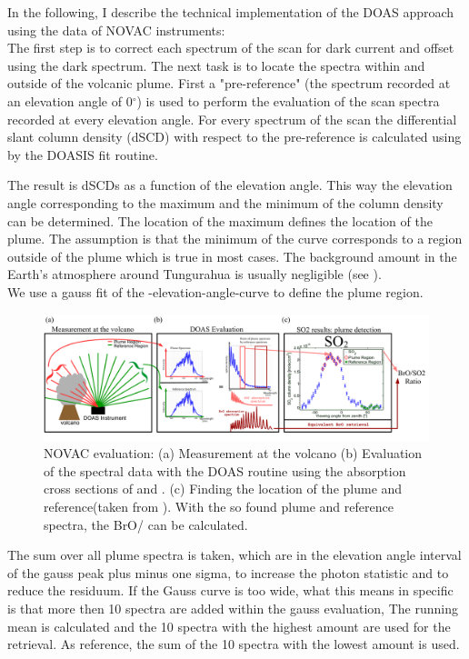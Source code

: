 

%
In the following, I describe the technical implementation of the DOAS approach using the data of NOVAC instruments:\\
%
The first step is to correct each spectrum of the scan for dark current and offset using the dark spectrum.
The next task is to locate the spectra within and outside of the volcanic plume.
First a "pre-reference" (the spectrum recorded at an elevation angle of  0$^{\circ} $) is used to perform the evaluation of the scan spectra recorded at every elevation angle.
For every spectrum of the scan the  differential slant column density (dSCD) with respect to the pre-reference is calculated using  by the DOASIS fit routine.

The result is  dSCDs as a function of the elevation angle. This way the elevation angle corresponding to the maximum and the minimum of the  column density can be determined. The location of the  maximum defines the location of the plume. The assumption is that the minimum of the  curve corresponds to a region outside of the plume which is true in most cases. The background  amount in the Earth's atmosphere around Tungurahua is usually negligible (see  ). \\
We use a gauss fit of the -elevation-angle-curve to define the plume region.
%
\begin{figure}
	\centering
	\includegraphics[width=1\linewidth]{Bilder/NOVAC_Eval}
	\caption{NOVAC evaluation: (a) Measurement at the volcano (b) Evaluation of the spectral data with the DOAS routine using the absorption cross sections of   and . (c) Finding the location of the plume and reference(taken from \cite{WarnachSimon}). With the so found plume and reference spectra, the BrO/ can be calculated. }
	\label{fig:NOVAC_Eval}
\end{figure}
The sum over all plume spectra is taken, which are in the elevation angle interval of the gauss peak plus minus one sigma, to increase the photon statistic and to reduce the residuum. If the Gauss curve is too wide, what this means in specific is that more then 10 spectra are added within the gauss evaluation, The running mean is calculated and the 10 spectra with the highest  amount are used for the retrieval. As reference, the sum of the 10 spectra with the lowest  amount is used.\\
